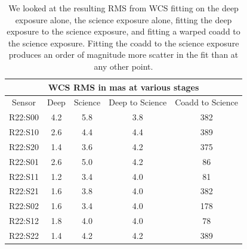 \documentclass[prd, nofootinbib, floatfix, 11pt,tightenlines,times]{article}
\begin{document}
\clearpage
\begin{table}
\centering
\begin{tabular}{|c|c|c|c|c|}
\hline
\multicolumn{5}{|c|}{WCS RMS in mas at various stages} \\
\hline
Sensor    & Deep & Science &  Deep to Science & Coadd to Science \\
\hline
R22:S00&4.2&5.8&3.8&382\\ 
R22:S10&2.6&4.4&4.4&389\\
R22:S20&1.4&3.6&4.2&375\\
R22:S01&2.6&5.0&4.2&86\\
R22:S11&1.2&3.4&4.0&81\\
R22:S21&1.6&3.8&4.0&382\\
R22:S02&1.6&3.4&4.0&178\\
R22:S12&1.8&4.0&4.0&78\\
R22:S22&1.4&4.2&4.2&389\\
\hline
\end{tabular}
\caption{We looked at the resulting RMS from WCS fitting on the deep exposure alone, the science exposure alone,
fitting the deep exposure to the science exposure, and fitting a warped coadd to the science exposure.  Fitting 
the coadd to the science exposure produces an order of magnitude more scatter in the fit than at any other point.\label{tab-wcsrms}}
\end{table}
\clearpage
\end{document}
